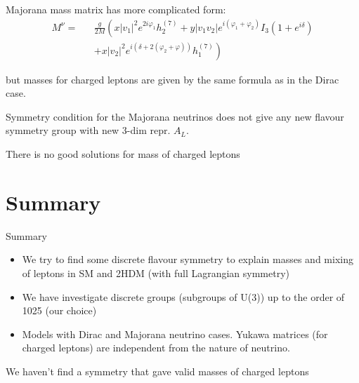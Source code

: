 \documentclass{beamer}
\begin{document}
\begin{frame}
Majorana mass matrix has more complicated form: 
\begin{eqnarray}
M^{\nu} =&&\frac{g}{2 M}\left(x \vert v_{1}\vert ^{2} e^{2 i \varphi_{1}}h_{2}^{(7)}+ y \vert v_{1} v_{2}\vert e^{i(\varphi_{1} + \varphi_{2})} I_{3} \left(1+e^{i\delta}\right) \right. \nonumber  \\
&&+ \left. x \vert v_{2}\vert ^{2} e^{i(\delta+2(\varphi_{2}+\varphi))}h_{1}^{(7)}\right)\nonumber
\end{eqnarray}

but \alert{masses for charged leptons are given by the same formula as in the Dirac case}.

Symmetry condition for the Majorana neutrinos does not give any new flavour symmetry group with new 3-dim repr. $A_L$. 

\alert{There is no good solutions for mass of charged leptons} 
\end{frame}

\section*{Summary}

\begin{frame}{Summary}

  \begin{itemize}
  \item
    We try to find some \alert{discrete flavour symmetry} to explain masses and mixing of leptons in SM and 2HDM (with  full Lagrangian symmetry)
  \item
    We have investigate discrete groups (\alert{subgroups of U(3)}) up to the order of 1025 (our choice)
  \item
    Models with \alert{Dirac and Majorana neutrino cases}. Yukawa matrices (for charged leptons) are independent from the nature of neutrino. 
  \end{itemize}
  

     \alert{ We haven't find a symmetry that gave valid masses of charged leptons}

\end{frame}
\end{document}
